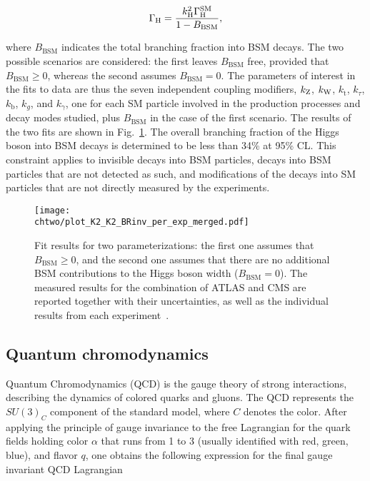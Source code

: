 \begin{equation}\label{eqn:SM_e45}
\Gamma_\mathrm{H} = \frac{k^2_\mathrm{H}\Gamma^\mathrm{SM}_\mathrm{H}}{1 - B_\mathrm{BSM}},
\end{equation}

\noindent where $B_\mathrm{BSM}$ indicates the total branching fraction into BSM decays.
The two possible scenarios are considered: the first leaves $B_\mathrm{BSM}$ free, provided that $B_\mathrm{BSM} \geq 0$, whereas the second assumes $B_\mathrm{BSM} = 0$. 
The parameters of interest in the fits to data are thus the seven independent coupling modifiers, $k_\mathrm{Z}$, $k_\mathrm{W}$, $k_\mathrm{t}$, $k_\tau$, $k_\mathrm{b}$, $k_g$, and $k_\gamma$, 
one for each SM particle involved in the production processes and decay modes studied, plus $B_\mathrm{BSM}$ in the case of the first scenario.
The results of the two fits are shown in Fig.~\ref{fig:HiggsCoupl}.
The overall branching fraction of the Higgs boson into BSM decays is determined to be less than 34\% at 95\% CL.
This constraint applies to invisible decays into BSM particles, decays into BSM particles that are not detected as such, and modifications of the decays into SM particles that are not directly measured by the experiments.

  \begin{figure}[!htb]
  \centering
  \texttt{[image: \\chtwo/plot\_K2\_K2\_BRinv\_per\_exp\_merged.pdf]}
  \caption{Fit results for two parameterizations: the first one assumes that $B_\mathrm{BSM} \geq 0$, and the second one assumes that there are no additional BSM contributions to the Higgs boson width ($B_\mathrm{BSM} = 0$). The measured results for the combination of ATLAS and CMS are reported together with their uncertainties, as well as the individual results from each experiment~\cite{Aad:2015zhl}.}
  \label{fig:HiggsCoupl}
\end{figure} 

\subsection{Quantum chromodynamics}\label{subsec:QCD}

Quantum Chromodynamics (QCD) is the gauge theory of strong interactions, describing the dynamics of colored quarks and gluons.
The QCD represents the $SU(3)_C$ component of the standard model, where $C$ denotes the color.
After applying the principle of gauge invariance to the free Lagrangian for the quark fields holding color $\alpha$ that runs from 1 to 3 (usually identified with red, green, blue), and flavor $q$, one obtains the following expression for the final gauge invariant QCD Lagrangian

